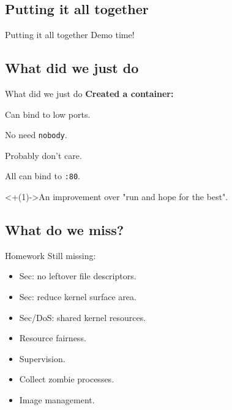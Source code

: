 \documentclass[14pt]{beamer}
\begin{document}
\subsection{Putting it all together}
\begin{frame}{Putting it all together}
    Demo time!
\end{frame}

\subsection{What did we just do}
\begin{frame}{What did we just do}
    \relax
    {\bf Created a container:}
    \begin{description}[<+(1)->]
        \item[Fake root] Can bind to low ports.
        \item[Isolated pids] No need {\tt nobody}.
        \item[Isolated mounts] Probably don't care.
        \item[Isolated network] All can bind to {\tt :80}.
    \end{description}
    \onslide<+(1)->{An improvement over "run and hope for the best".}
\end{frame}

\subsection{What do we miss?}
\begin{frame}{Homework}
    Still missing:
    \begin{itemize}[<+(1)->]
        \item Sec: no leftover file descriptors.
        \item Sec: reduce kernel surface area.
        \item Sec/DoS: shared kernel resources.
        \item Resource fairness.
        \item Supervision.
        \item Collect zombie processes.
        \item Image management.
    \end{itemize}
\end{frame}
\end{document}
